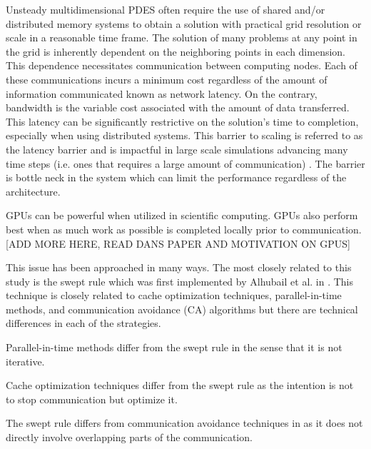 \documentclass[review]{elsarticle}
\begin{document}
Unsteady multidimensional PDES often require the use of shared and/or distributed memory systems to obtain a solution with practical grid resolution or scale in a reasonable time frame. The solution of many problems at any point in the grid is inherently dependent on the neighboring points in each dimension. This dependence necessitates communication between computing nodes. Each of these communications incurs a minimum cost regardless of the amount of information communicated known as network latency. On the contrary, bandwidth is the variable cost associated with the amount of data transferred. This latency can be significantly restrictive on the solution's time to completion, especially when using distributed systems. This barrier to scaling is referred to as the latency barrier and is impactful in large scale simulations advancing many time steps (i.e. ones that requires a large amount of communication) \cite{Alhubail2016ThePDEs}. The barrier is bottle neck in the system which can limit the performance regardless of the architecture.

\par
GPUs can be powerful when utilized in scientific computing. GPUs also perform best when as much work as possible is completed locally prior to communication. [ADD MORE HERE, READ DANS PAPER AND MOTIVATION ON GPUS]

\par This issue has been approached in many ways. The most closely related to this study is the swept rule which was first implemented by Alhubail et al. in \cite{Alhubail2016ThePDEs}. This technique is closely related to cache optimization techniques, parallel-in-time methods, and communication avoidance (CA) algorithms but there are technical differences in each of the strategies.

\par
Parallel-in-time methods differ from the swept rule in the sense that it is not iterative.

\par
Cache optimization techniques differ from the swept rule as the intention is not to stop communication but optimize it.

\par
The swept rule differs from communication avoidance techniques in as it does not directly involve overlapping parts of the communication.
\end{document}
